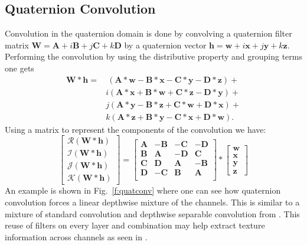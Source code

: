 \subsection{Quaternion Convolution}\label{s:qc}
Convolution in the quaternion domain is done by convolving a quaternion filter matrix $\textbf{W}=\textbf{A}+\textit{i}\textbf{B}+\textit{j}\textbf{C}+\textit{k}\textbf{D}$ by a quaternion vector $\textbf{h}=\textbf{w}+\textit{i}\textbf{x}+\textit{j}\textbf{y}+\textit{k}\textbf{z}$. 
Performing the convolution by using the distributive property and grouping terms one gets
\begin{align}
\textbf{W}\ast \textbf{h} = &~(\textbf{A}\ast\textbf{w}-\textbf{B}\ast\textbf{x}-\textbf{C}\ast\textbf{y}-\textbf{D}\ast\textbf{z}) + \nonumber \\ 
&\textit{i}(\textbf{A}\ast\textbf{x}+\textbf{B}\ast\textbf{w}+\textbf{C}\ast\textbf{z}-\textbf{D}\ast\textbf{y}) + \nonumber \\
&\textit{j}(\textbf{A}\ast\textbf{y}-\textbf{B}\ast\textbf{z}+\textbf{C}\ast\textbf{w}+\textbf{D}\ast\textbf{x}) + \nonumber \\
&\textit{k}(\textbf{A}\ast\textbf{z}+\textbf{B}\ast\textbf{y}-\textbf{C}\ast\textbf{x}+\textbf{D}\ast\textbf{w}).
\label{eq:convolve1}
\end{align}
Using a matrix to represent the components of the convolution we have:
\begin{equation}
\begin{bmatrix}
 \mathscr{R}(\textbf{W}\ast \textbf{h}) \\ 
 \mathscr{I}(\textbf{W}\ast \textbf{h}) \\
 \mathscr{J}(\textbf{W}\ast \textbf{h}) \\
 \mathscr{K}(\textbf{W}\ast \textbf{h}) 
\end{bmatrix}
=
\begin{bmatrix}
 \textbf{A} & -\textbf{B} & -\textbf{C} & -\textbf{D}\\
 \textbf{B} & \textbf{A} & -\textbf{D} & \textbf{C} \\
 \textbf{C} & \textbf{D} & \textbf{A} & -\textbf{B} \\
 \textbf{D} & -\textbf{C} & \textbf{B} & \textbf{A} \\
\end{bmatrix}
\ast
\begin{bmatrix}
 \textbf{w} \\ 
 \textbf{x} \\
 \textbf{y} \\
 \textbf{z}
\end{bmatrix}
\label{eq:}
\end{equation}
An example is shown in Fig.~\ref{f:quatconv} where one can see how quaternion convolution forces a linear depthwise mixture of the channels. This is similar to a mixture of standard convolution and depthwise separable convolution from \cite{chollet2016xception}. This reuse of filters on every layer and combination may help extract texture information across channels as seen in \cite{shi2007quaternion}.

